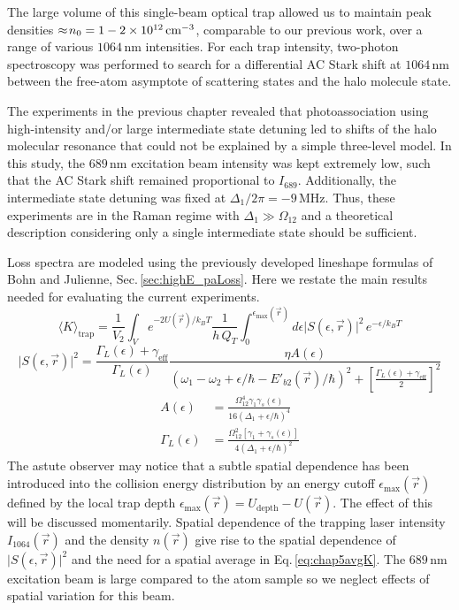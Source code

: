The large volume of this single-beam optical trap allowed us to maintain peak densities $\approx\!n_0 = 1-2 \times 10^{12} \, \text{cm}^{-3}$, comparable to our previous work, over a range of various $1064$\,nm intensities.
For each trap intensity, two-photon spectroscopy was performed to search for a differential AC Stark shift at $1064\,\text{nm}$ between the free-atom asymptote of scattering states and the halo molecule state.

The experiments in the previous chapter revealed that photoassociation using high-intensity and/or large intermediate state detuning led to shifts of the halo molecular resonance that could not be explained by a simple three-level model.
In this study, the $689$\,nm excitation beam intensity was kept extremely low, such that the AC Stark shift remained proportional to $I_{689}$.
Additionally, the intermediate state detuning was fixed at $\Delta_1/2 \pi = -9$\,MHz.
Thus, these experiments are in the Raman regime with $\Delta_1 \gg \Omega_{12}$ and a theoretical description considering only a single intermediate state should be sufficient.


Loss spectra are modeled using the previously developed lineshape formulas of Bohn and Julienne, Sec.\,\ref{sec:highE_paLoss}.
Here we restate the main results needed for evaluating the current experiments.
\begingroup
\addtolength{\jot}{1em}
\begin{equation} \label{eq:chap5avgK}
	\langle K \rangle_\text{trap} = \frac{1}{V_2} \int_V e^{-2 U(\vec{r})/k_{B}T} \frac{1}{h\,Q_{T}} \int_{0}^{\epsilon_{\text{max}}(\vec{r})} d\epsilon \vert S(\epsilon, \vec{r}) \vert^2 \,e^{-\epsilon/k_{B}T}
\end{equation}
\begin{equation}\label{5equationApproxLorentzian}
  \vert S(\epsilon, \vec{r}) \vert^2 = \frac{\Gamma_L(\epsilon)+\gamma_{\text{eff}}}{\Gamma_L(\epsilon)} \frac{\eta  A(\epsilon)} {\left(\omega_1-\omega_2+\epsilon/\hbar-E'_{b2}(\vec{r})/\hbar\right)^2+\left[
  	\frac{\Gamma_L(\epsilon)+\gamma_{\text{eff}}}{2}\right]^2}
\end{equation}
\begin{align}
  A(\epsilon) &= \frac{\Omega_{12}^{4}\gamma_1 \gamma_s(\epsilon)}{16(\Delta_1+\epsilon/\hbar)^4} \\
  \Gamma_L(\epsilon) &= \frac{\Omega_{12}^{2}[\gamma_1 +\gamma_s(\epsilon)]}{4(\Delta_1+\epsilon/\hbar)^2}
\end{align}
\endgroup
The astute observer may notice that a subtle spatial dependence has been introduced into the collision energy distribution by an energy cutoff $\epsilon_{\text{max}}(\vec{r})$ defined by the local trap depth $\epsilon_{\text{max}}(\vec{r}) = U_{\text{depth}} - U(\vec{r})$.
The effect of this will be discussed momentarily.
Spatial dependence of the trapping laser intensity $I_{1064}(\vec{r})$ and the density $n(\vec{r})$ give rise to the spatial dependence of $\vert S(\epsilon, \vec{r}) \vert^2$ and the need for a spatial average in Eq.\,\ref{eq:chap5avgK}.
The $689$\,nm excitation beam is large compared to the atom sample so we neglect effects of spatial variation for this beam.

